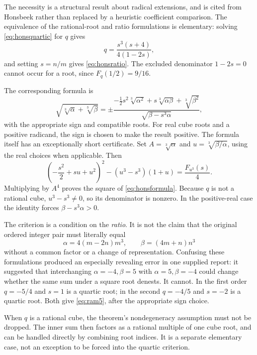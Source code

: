 \documentclass[11pt,letterpaper]{article}
\numberwithin{equation}{section}
\theoremstyle{definition}
\theoremstyle{remark}
\begin{document}
The necessity is a structural result about radical extensions, and is cited from Honsbeek rather than replaced by a heuristic coefficient comparison. The equivalence of the rational-root and ratio formulations is elementary: solving \eqref{eq:honsquartic} for $q$ gives
\[
q=\frac{s^3(s+4)}{4(1-2s)},
\]
and setting $s=n/m$ gives \eqref{eq:honsratio}. The excluded denominator $1-2s=0$ cannot occur for a root, since $F_q(1/2)=9/16$.

The corresponding formula is
\begin{equation}\label{eq:honsformula}
\sqrt{\sqrt[3]{\alpha}+\sqrt[3]{\beta}}
=\pm\frac{-\tfrac12s^2\sqrt[3]{\alpha^2}
+s\sqrt[3]{\alpha\beta}+\sqrt[3]{\beta^2}}
{\sqrt{\beta-s^3\alpha}},
\end{equation}
with the appropriate sign and compatible roots. For real cube roots and a positive radicand, the sign is chosen to make the result positive. The formula itself has an exceptionally short certificate. Set $A=\sqrt[3]\alpha$ and $u=\sqrt[3]{\beta/\alpha}$, using the real choices when applicable. Then
\begin{equation}\label{eq:honscertificate}
\left(-\frac{s^2}{2}+su+u^2\right)^2
-(u^3-s^3)(1+u)=\frac{F_{u^3}(s)}4.
\end{equation}
Multiplying by $A^4$ proves the square of \eqref{eq:honsformula}. Because $q$ is not a rational cube, $u^3-s^3\ne0$, so its denominator is nonzero. In the positive-real case the identity forces $\beta-s^3\alpha>0$.

The criterion is a condition on the \emph{ratio}. It is not the claim that the original ordered integer pair must literally equal
\[
\alpha=4(m-2n)m^3,
\qquad \beta=(4m+n)n^3
\]
without a common factor or a change of representation. Confusing these formulations produced an especially revealing error in one supplied report: it suggested that interchanging $\alpha=-4,\beta=5$ with $\alpha=5,\beta=-4$ could change whether the same sum under a square root denests. It cannot. In the first order $q=-5/4$ and $s=1$ is a quartic root; in the second $q=-4/5$ and $s=-2$ is a quartic root. Both give \eqref{eq:ram5}, after the appropriate sign choice.

When $q$ is a rational cube, the theorem's nondegeneracy assumption must not be dropped. The inner sum then factors as a rational multiple of one cube root, and can be handled directly by combining root indices. It is a separate elementary case, not an exception to be forced into the quartic criterion.
\end{document}
